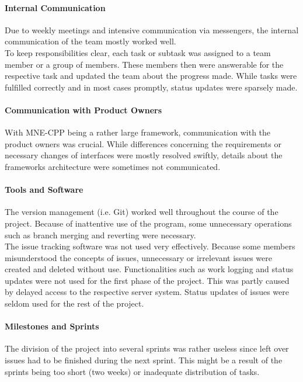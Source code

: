 \paragraph{Internal Communication}

Due to weekly meetings and intensive communication via messengers, the internal communication of the team mostly worked well.\\
To keep responsibilities clear, each task or subtask was assigned to a team member or a group of members. These members then were answerable for the respective task and updated the team about the progress made. While tasks were fulfilled correctly and in most cases promptly, status updates were sparsely made.


\paragraph{Communication with Product Owners}

With MNE-CPP being a rather large framework, communication with the product owners was crucial. While differences concerning the requirements or necessary changes of interfaces were mostly resolved swiftly, details about the frameworks architecture were sometimes not communicated. 

\paragraph{Tools and Software}

The version management (i.e. Git) worked well throughout the course of the project. Because of inattentive use of the program, some unnecessary operations such as branch merging and reverting were necessary.\\
The issue tracking software was not used very effectively. Because some members misunderstood the concepts of issues, unnecessary or irrelevant issues were created and deleted without use. Functionalities such as work logging and status updates were not used for the first phase of the project. This was partly caused by delayed access to the respective server system. Status updates of issues were seldom used for the rest of the project.

\paragraph{Milestones and Sprints}

The division of the project into several sprints was rather useless since left over issues had to be finished during the next sprint. This might be a result of the sprints being too short (two weeks) or inadequate distribution of tasks.

